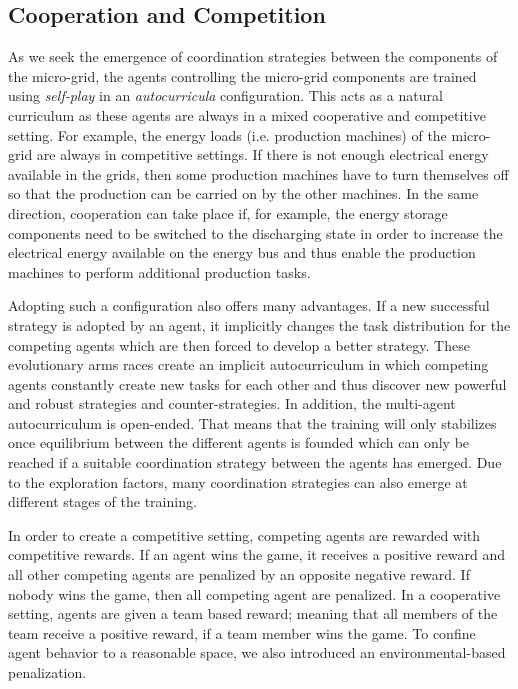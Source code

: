 \subsection{Cooperation and Competition}
\label{subsec:42}
As we seek the emergence of coordination strategies between the components of the micro-grid, the agents controlling the micro-grid components are trained using \textit{self-play} in an \textit{autocurricula} configuration. This acts as a natural curriculum as these agents are always in a mixed cooperative and competitive setting. For example, the energy loads (i.e. production machines) of the micro-grid are always in competitive settings. If there is not enough electrical energy available in the grids, then some production machines have to turn themselves off so that the production can be carried on by the other machines. In the same direction, cooperation can take place if, for example, the energy storage components need to be switched to the discharging state in order to increase the electrical energy available on the energy bus and thus enable the production machines to perform additional production tasks.

Adopting such a configuration also offers many advantages. If a new successful strategy is adopted by an agent, it implicitly changes the task distribution for the competing agents which are then forced to develop a better strategy. These evolutionary arms races create an implicit autocurriculum in which competing agents constantly create new tasks for each other and thus discover new powerful and robust strategies and counter-strategies. In addition, the multi-agent autocurriculum is open-ended. That means that the training will only stabilizes once equilibrium between the different agents is founded which can only be reached if a suitable coordination strategy between the agents has emerged. Due to the exploration factors, many coordination strategies can also emerge at different stages of the training.

In order to create a competitive setting, competing agents are rewarded with competitive rewards. If an agent wins the game, it receives a positive reward and all other competing agents are penalized by an opposite negative reward. If nobody wins the game, then all competing agent are penalized. In a cooperative setting, agents are given a team based reward; meaning that all members of the team receive a positive reward, if a team member wins the game. To confine agent behavior to a reasonable space, we also introduced an environmental-based penalization.

